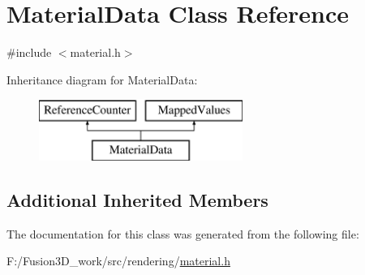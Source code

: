 \hypertarget{class_material_data}{}\section{Material\+Data Class Reference}
\label{class_material_data}


{\ttfamily \#include $<$material.\+h$>$}

Inheritance diagram for Material\+Data\+:\begin{figure}[H]
\begin{center}
\leavevmode
\includegraphics[height=2.000000cm]{class_material_data}
\end{center}
\end{figure}
\subsection*{Additional Inherited Members}


The documentation for this class was generated from the following file\+:\begin{DoxyCompactItemize}
\item 
F\+:/\+Fusion3\+D\+\_\+work/src/rendering/\hyperlink{material_8h}{material.\+h}\end{DoxyCompactItemize}
